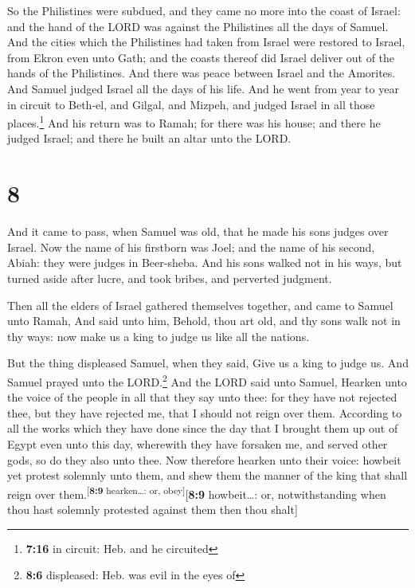  So the Philistines were subdued, and they came no more
into the coast of Israel: and the hand of the LORD was against the
Philistines all the days of Samuel.  And the cities which
the Philistines had taken from Israel were restored to Israel, from
Ekron even unto Gath; and the coasts thereof did Israel deliver out of
the hands of the Philistines. And there was peace between Israel and the
Amorites.  And Samuel judged Israel all the days of his
life.  And he went from year to year in circuit to
Beth-el, and Gilgal, and Mizpeh, and judged Israel in all those
places.\footnote{\textbf{7:16} in circuit: Heb. and he circuited}
 And his return was to Ramah; for there was his house;
and there he judged Israel; and there he built an altar unto the LORD.

\hypertarget{section-7}{%
\section{8}\label{section-7}}

 And it came to pass, when Samuel was old, that he made
his sons judges over Israel.  Now the name of his
firstborn was Joel; and the name of his second, Abiah: they were judges
in Beer-sheba.  And his sons walked not in his ways, but
turned aside after lucre, and took bribes, and perverted judgment.

 Then all the elders of Israel gathered themselves
together, and came to Samuel unto Ramah,  And said unto
him, Behold, thou art old, and thy sons walk not in thy ways: now make
us a king to judge us like all the nations.

 But the thing displeased Samuel, when they said, Give us
a king to judge us. And Samuel prayed unto the LORD.\footnote{\textbf{8:6}
  displeased: Heb. was evil in the eyes of}  And the LORD
said unto Samuel, Hearken unto the voice of the people in all that they
say unto thee: for they have not rejected thee, but they have rejected
me, that I should not reign over them.  According to all
the works which they have done since the day that I brought them up out
of Egypt even unto this day, wherewith they have forsaken me, and served
other gods, so do they also unto thee.  Now therefore
hearken unto their voice: howbeit yet protest solemnly unto them, and
shew them the manner of the king that shall reign over
them.\textsuperscript{{[}\textbf{8:9} hearken\ldots: or,
obey{]}}{[}\textbf{8:9} howbeit\ldots: or, notwithstanding when thou
hast solemnly protested against them then thou shalt{]}

